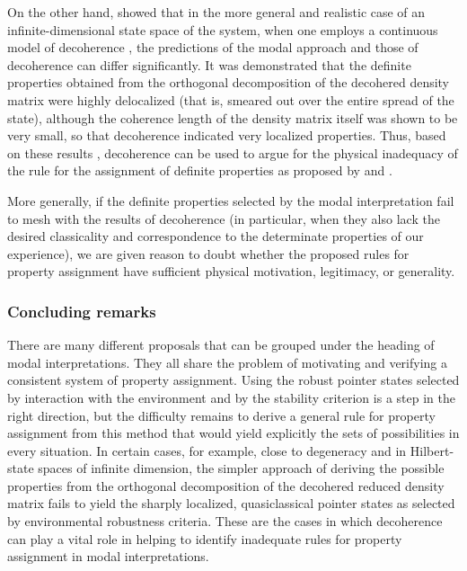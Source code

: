 \documentclass[twocolumn,rmp,aps,amsmath,amsfonts,noshowkeys,noshowpacs]{revtex4}
\begin{document}
On the other hand, \citet{Bacciagaluppi:2000:yz} showed that in the
more general and realistic case of an infinite-dimensional state space
of the system, when one employs a continuous model of decoherence
\citep[namely, that of][]{Joos:1985:iu}, the predictions of the modal
approach \citep{Dieks:1989:rm,Vermaas:1995:gd} and those of
decoherence can differ significantly. It was demonstrated that the
definite properties obtained from the orthogonal decomposition of the
decohered density matrix were highly delocalized (that is, smeared out
over the entire spread of the state), although the coherence length of
the density matrix itself was shown to be very small, so that
decoherence indicated very localized properties.  Thus, based on these
results \citep[and similar ones of][]{Donald:1998:xz}, decoherence can
be used to argue for the physical inadequacy of the rule for the
assignment of definite properties as proposed by \citet{Dieks:1989:rm}
and \citet{Vermaas:1995:gd}.

More generally, if the definite properties selected by the modal
interpretation fail to mesh with the results of decoherence (in
particular, when they also lack the desired classicality and
correspondence to the determinate properties of our experience), we
are given reason to doubt whether the proposed rules for property
assignment have sufficient physical motivation, legitimacy, or
generality.


\subsubsection{Concluding remarks}

There are many different proposals that can be grouped under the
heading of modal interpretations. They all share the problem of
motivating and verifying a consistent system of property assignment.
Using the robust pointer states selected by interaction with the
environment and by the stability criterion is a step in the right
direction, but the difficulty remains to derive a general rule for
property assignment from this method that would yield explicitly the
sets of possibilities in every situation.  In certain cases, for
example, close to degeneracy and in Hilbert-state spaces of infinite
dimension, the simpler approach of deriving the possible properties
from the orthogonal decomposition of the decohered reduced density
matrix fails to yield the sharply localized, quasiclassical pointer
states as selected by environmental robustness criteria.  These are
the cases in which decoherence can play a vital role in helping to
identify inadequate rules for property assignment in modal
interpretations.
\end{document}
